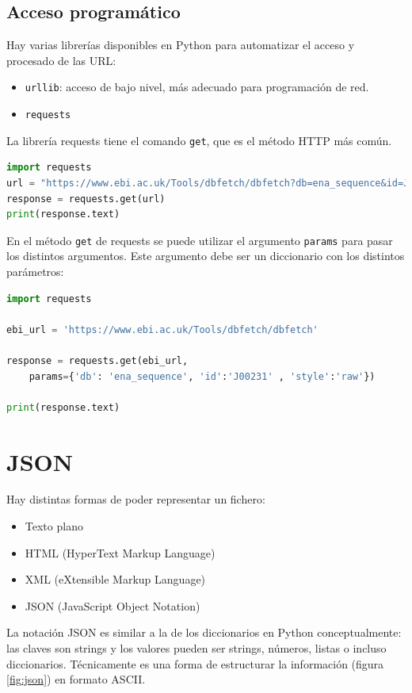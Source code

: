 \subsection{Acceso programático}
Hay varias librerías disponibles en Python para automatizar el acceso y procesado de las URL:
\begin{itemize}
\item \texttt{urllib}: acceso de bajo nivel, más adecuado para programación de red.
\item \texttt{requests}
\end{itemize}

La librería requests tiene el comando \texttt{get}, que es el método HTTP más común. 
\begin{lstlisting}[language=Python]
import requests
url = "https://www.ebi.ac.uk/Tools/dbfetch/dbfetch?db=ena_sequence&id=J00231&style=raw"
response = requests.get(url)
print(response.text)
\end{lstlisting}

En el método \texttt{get} de requests se puede utilizar el argumento \texttt{params} para pasar los distintos argumentos. Este argumento debe ser un diccionario con los distintos parámetros:
\begin{lstlisting}[language=Python]
import requests

ebi_url = 'https://www.ebi.ac.uk/Tools/dbfetch/dbfetch'

response = requests.get(ebi_url,
    params={'db': 'ena_sequence', 'id':'J00231' , 'style':'raw'})

print(response.text)
\end{lstlisting}

\section{JSON}
Hay distintas formas de poder representar un fichero:
\begin{itemize}
\item Texto plano
\item HTML (HyperText Markup Language)
\item XML (eXtensible Markup Language)
\item JSON (JavaScript Object Notation)
\end{itemize}

La notación JSON es similar a la de los diccionarios en Python conceptualmente: las claves son strings y los valores pueden ser strings, números, listas o incluso diccionarios. Técnicamente es una forma de estructurar la información (figura \ref{fig:json}) en formato ASCII. 

